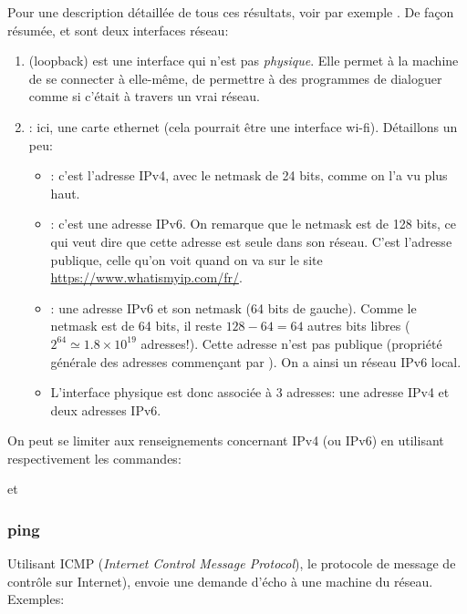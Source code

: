 Pour une description détaillée de tous ces résultats, voir par exemple
\cite{comip}.  De façon résumée,  et  sont deux
interfaces réseau:
\begin{enumerate}
  \item {} (loopback) est une interface qui n'est pas
    \emph{physique}. Elle permet à la machine de se connecter à
    elle-même, de permettre à des programmes de dialoguer \og comme
    si\fg{} c'était à travers un vrai réseau.
  \item {}: ici, une carte ethernet (cela pourrait être une
    interface wi-fi). Détaillons un peu:
    \begin{itemize}
      \item {}: c'est l'adresse IPv4, avec le
        netmask de 24 bits, comme on l'a vu plus haut.
      \item {}: c'est une adresse
        IPv6. On remarque que le netmask est de 128 bits, ce qui veut
        dire que cette adresse est seule dans son réseau. C'est
        l'adresse publique, celle qu'on voit quand on va sur le site
        \url{https://www.whatismyip.com/fr/}.
      
      \item {}: une adresse IPv6
        et son netmask (64 bits de gauche). Comme le netmask est de 64
        bits,
        il reste $128-64  = 64$
        autres bits libres ($2^{64} \simeq
        1.8 \times 10^{19}$ adresses!). Cette adresse n'est pas
        publique (propriété générale des adresses commençant par
        ). On a ainsi  un réseau IPv6 local.

      \item L'interface physique est donc associée à 3 adresses: une
        adresse IPv4 et deux adresses IPv6.
    \end{itemize}
\end{enumerate}

On peut se limiter aux renseignements concernant IPv4 (ou IPv6) en
utilisant respectivement les commandes:


et

\subsubsection{ping}
Utilisant ICMP (\emph{Internet Control Message Protocol}), le
protocole de message de contrôle sur Internet),   envoie une
demande d'écho à une machine du réseau. Exemples:

